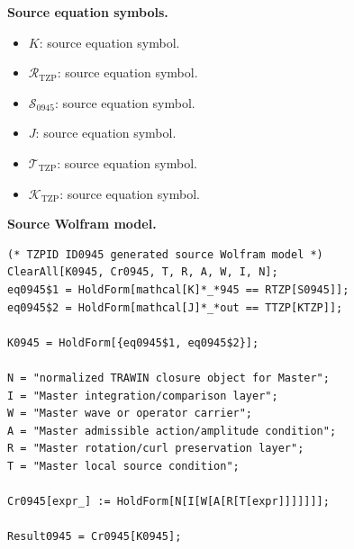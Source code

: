 \begin{minipage}[t]{0.49\linewidth}
\begingroup
\small
\raggedright
\textbf{Source equation symbols.}\par
\begin{itemize}[leftmargin=1.35em,itemsep=1pt,topsep=1pt,parsep=0pt]
    \item $K$: source equation symbol.
    \item $\mathcal{R}_{\mathrm{TZP}}$: source equation symbol.
    \item $\mathcal{S}_{0945}$: source equation symbol.
    \item $J$: source equation symbol.
    \item $\mathcal{T}_{\mathrm{TZP}}$: source equation symbol.
    \item $\mathcal{K}_{\mathrm{TZP}}$: source equation symbol.
\end{itemize}
\endgroup
\end{minipage}\hfill
\begin{minipage}[t]{0.47\linewidth}
\begingroup
\scriptsize
\raggedright
\textbf{Source Wolfram model.}\par
\begin{Verbatim}[fontsize=\tiny,breaklines=true,breakanywhere=true]
(* TZPID ID0945 generated source Wolfram model *)
ClearAll[K0945, Cr0945, T, R, A, W, I, N];
eq0945$1 = HoldForm[mathcal[K]*_*945 == RTZP[S0945]];
eq0945$2 = HoldForm[mathcal[J]*_*out == TTZP[KTZP]];

K0945 = HoldForm[{eq0945$1, eq0945$2}];

N = "normalized TRAWIN closure object for Master";
I = "Master integration/comparison layer";
W = "Master wave or operator carrier";
A = "Master admissible action/amplitude condition";
R = "Master rotation/curl preservation layer";
T = "Master local source condition";

Cr0945[expr_] := HoldForm[N[I[W[A[R[T[expr]]]]]]];

Result0945 = Cr0945[K0945];
\end{Verbatim}
\endgroup
\end{minipage}

